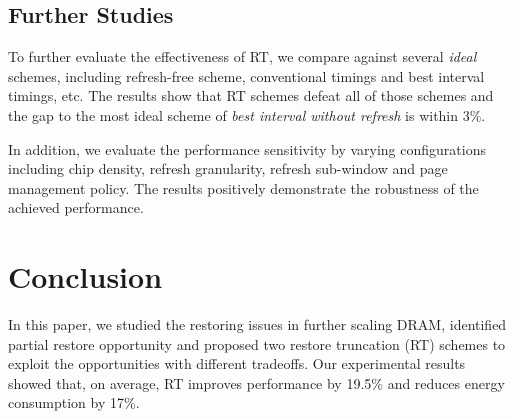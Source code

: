 \subsection{Further Studies}
\label{SEC:ideal_comp}
To further evaluate the effectiveness of RT, we compare against several \textit{ideal} schemes, including refresh-free scheme, conventional timings and best interval timings, etc. The results show that RT schemes defeat all of those schemes and the gap to the most ideal scheme of \textit{best interval without refresh} is within 3\%.

In addition, we evaluate the performance sensitivity by varying configurations including chip density, refresh granularity, refresh sub-window and page management policy. The results positively demonstrate the robustness of the achieved performance.

\section{Conclusion}\label{sec:conclusion}
In this paper, we studied the restoring issues in further scaling DRAM, identified partial restore opportunity and proposed two restore truncation (RT) schemes to exploit the opportunities with different tradeoffs. Our experimental results showed that, on average, RT improves performance by 19.5\% and reduces  energy consumption by 17\%.
